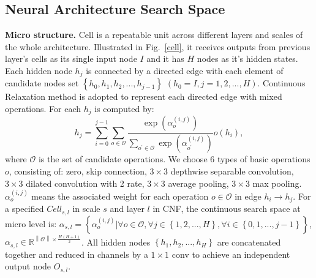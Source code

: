 \documentclass[journal]{IEEEtran}
\begin{document}
\subsection{Neural Architecture Search Space}

\label{arch}
\textbf{Micro structure.} Cell is a repeatable unit across different layers and scales of the whole architecture. Illustrated in Fig.~\ref{cell}, it receives outputs from previous layer's cells as its single input node $I$ and it has $H$ nodes as it's hidden states. Each hidden node $h_j$ is connected by a directed edge with each element of candidate nodes set $\left \{ h_0,h_1,h_2,...,h_{j-1}\right \}$ $\left ( h_0=I,j=1,2,...,H\right)$. Continuous Relaxation \cite{liu2018darts} method is adopted to represent each directed edge with mixed operations. For each $h_j$ is computed by:
\begin{equation}
h_j=\sum_{i=0}^{j-1}\sum_{o \in \mathcal{O}}\frac{\exp \left(\alpha_{o}^{(i, j)}\right)}{\sum_{o^{\prime} \in \mathcal{O}} \exp \left(\alpha_{o^{\prime}}^{(i, j)}\right)} o(h_i),
\end{equation}
where $\mathcal{O}$ is the set of candidate operations. We choose 6 types of basic operations $o$, consisting of: zero, skip connection, $3\times3$ depthwise separable convolution, $3\times3$ dilated convolution with 2 rate, $3\times3$ average pooling, $3\times3$ max pooling. $\alpha_{o}^{(i, j)}$ means the associated weight for each operation $o\in \mathcal{O}$ in edge $h_i \rightarrow h_j$. For a specified $Cell_{s,l}$ in scale $s$ and layer $l$ in CNF, the continuous search space at micro level is: $\alpha_{s,l}=\left\{\alpha_{o}^{(i, j)}|\forall o\in\mathcal{O},\forall j\in\left\lbrace 1,2,...,H\right\rbrace ,\forall i\in\left\lbrace 0,1,...,j-1 \right\rbrace \right\}$, $\alpha_{s,l}\in \mathbb{R}^{\left\|\mathcal{O}\right\|\times\frac{H \left( H+1\right)}{2}}$. All hidden nodes $\left \{ h_1,h_2,...,h_H\right \}$ are concatenated together and reduced in channels by a $1\times1$ conv to achieve an independent output node $O_{s,l}$. 
\end{document}
